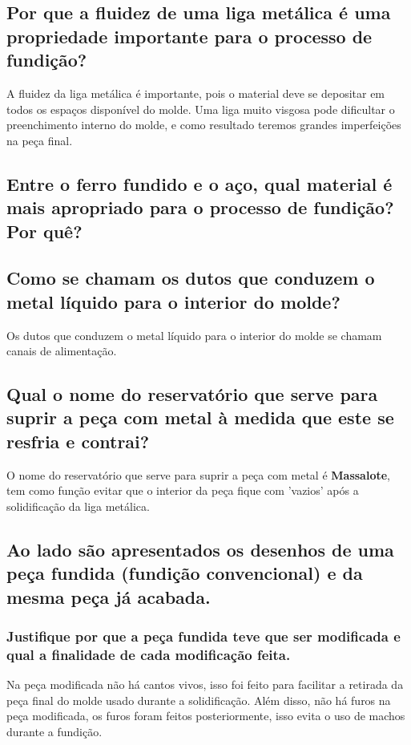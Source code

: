 \documentclass[a4paper, 12pt]{article}
\begin{document}
	\subsection{Por que a fluidez de uma liga metálica é uma propriedade importante para o processo de fundição?}
	A fluidez da liga metálica é importante, pois o material deve se depositar em todos os espaços disponível do molde. Uma liga muito visgosa pode dificultar o preenchimento interno do molde, e como resultado teremos grandes imperfeições na peça final.
	
	\subsection{Entre o ferro fundido e o aço, qual material é mais apropriado para o processo de fundição? Por quê?}
	
	\subsection{Como se chamam os dutos que conduzem o metal líquido para o interior do molde?}
	Os dutos que conduzem o metal líquido para o interior do molde se chamam canais de alimentação.
	
	\subsection{Qual o nome do reservatório que serve para suprir a peça com metal à medida que este se resfria e contrai?}
	O nome do reservatório que serve para suprir a peça com metal é \textbf{Massalote}, tem como função evitar que o interior da peça fique com 'vazios' após a solidificação da liga metálica.
	
	\subsection{Ao lado são apresentados os desenhos de uma peça fundida (fundição convencional) e da mesma peça já acabada.}
	\subsubsection{Justifique por que a peça fundida teve que ser modificada e qual a finalidade de cada modificação feita.}
	Na peça modificada não há cantos vivos, isso foi feito para facilitar a retirada da peça final do molde usado durante a solidificação. Além disso, não há furos na peça modificada, os furos foram feitos posteriormente, isso evita o uso de machos durante a fundição.
\end{document}

